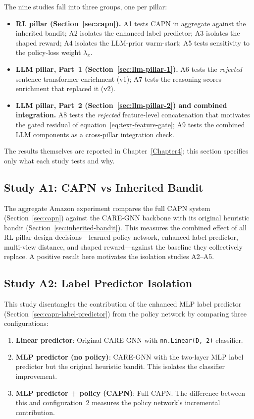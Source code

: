 The nine studies fall into three groups, one per pillar:

\begin{itemize}
    \item \textbf{RL pillar (Section~\ref{sec:capn}).} A1 tests CAPN in aggregate against the inherited bandit; A2 isolates the enhanced label predictor; A3 isolates the shaped reward; A4 isolates the LLM-prior warm-start; A5 tests sensitivity to the policy-loss weight $\lambda_\pi$.
    \item \textbf{LLM pillar, Part~1 (Section~\ref{sec:llm-pillar-1}).} A6 tests the \emph{rejected} sentence-transformer enrichment (v1); A7 tests the reasoning-scores enrichment that replaced it (v2).
    \item \textbf{LLM pillar, Part~2 (Section~\ref{sec:llm-pillar-2}) and combined integration.} A8 tests the \emph{rejected} feature-level concatenation that motivates the gated residual of equation~\eqref{eq:text-feature-gate}; A9 tests the combined LLM components as a cross-pillar integration check.
\end{itemize}

The results themselves are reported in Chapter~\ref{Chapter4}; this section specifies only what each study tests and why.

\subsection{Study A1: CAPN vs Inherited Bandit}

The aggregate Amazon experiment compares the full CAPN system (Section~\ref{sec:capn}) against the CARE-GNN backbone with its original heuristic bandit (Section~\ref{sec:inherited-bandit}). This measures the combined effect of all RL-pillar design decisions---learned policy network, enhanced label predictor, multi-view distance, and shaped reward---against the baseline they collectively replace. A positive result here motivates the isolation studies A2--A5.

\subsection{Study A2: Label Predictor Isolation}

This study disentangles the contribution of the enhanced MLP label predictor (Section~\ref{sec:capn-label-predictor}) from the policy network by comparing three configurations:
\begin{enumerate}
    \item \textbf{Linear predictor}: Original CARE-GNN with \texttt{nn.Linear(D, 2)} classifier.
    \item \textbf{MLP predictor (no policy)}: CARE-GNN with the two-layer MLP label predictor but the original heuristic bandit. This isolates the classifier improvement.
    \item \textbf{MLP predictor + policy (CAPN)}: Full CAPN. The difference between this and configuration~2 measures the policy network's incremental contribution.
\end{enumerate}

